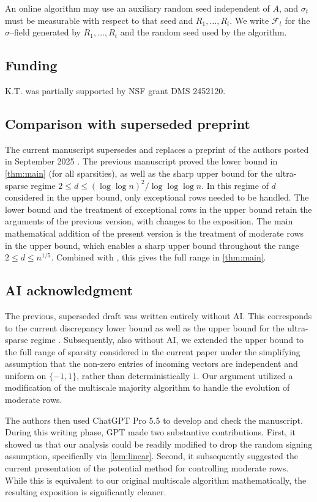 \documentclass[reqno,english]{amsart}
\newcommand*{\calF}{\mathcal F}
\theoremstyle{definition}
\begin{document}
An online algorithm may use an auxiliary random seed independent of $A$, and
$\sigma_t$ must be measurable with respect to that seed and
$R_1,\ldots,R_t$.  We write $\calF_t$
for the $\sigma$--field generated by $R_1,\ldots,R_t$
and the random seed used by the algorithm.




\subsection*{Funding}
K.T. was partially supported by NSF grant DMS 2452120.

\subsection*{Comparison with superseded preprint}
The current manuscript supersedes and replaces a preprint of the authors posted in September 2025 \cite{AT-old}. The previous manuscript proved the lower bound in \cref{thm:main} (for all sparsities), as well as the sharp upper bound for the ultra-sparse regime $2 \le d \le (\log\log n)^2/\log\log\log n$. In this regime of $d$ considered in the upper bound, only exceptional rows needed to be handled. The lower bound and the treatment of exceptional rows in the upper bound retain the arguments of the previous version, with changes to the exposition. The main mathematical addition of the present version is the treatment of moderate rows in the upper bound, which enables a sharp upper bound throughout the range $2\le d\le {n^{1/5}}$. Combined with \cite{altschuler-tikhomirov-bf}, this gives the full range in \cref{thm:main}. 

\subsection*{AI acknowledgment}
The previous, superseded draft was written entirely without AI. This corresponds to the current discrepancy lower bound as well as the upper bound for the ultra-sparse regime \cite{AT-old}. Subsequently, also without AI, we extended the upper bound to the full range of sparsity considered in the current paper under the simplifying assumption that the non-zero entries of incoming vectors are independent and uniform on $\{-1,1\}$, rather than deterministically $1$. Our argument utilized a modification of the multiscale majority algorithm \cite{ALS2,kim-roche} to handle the evolution of moderate rows. 

The authors then used ChatGPT Pro 5.5 to develop and check the manuscript. During this writing phase, GPT made two substantive contributions. First, it showed us that our analysis could be readily modified to drop the random signing assumption, specifically via \cref{lem:linear}. Second, it subsequently suggested the current presentation of the potential method for controlling moderate rows. While this is equivalent to our original multiscale algorithm mathematically, the resulting exposition is significantly cleaner. 
\end{document}
